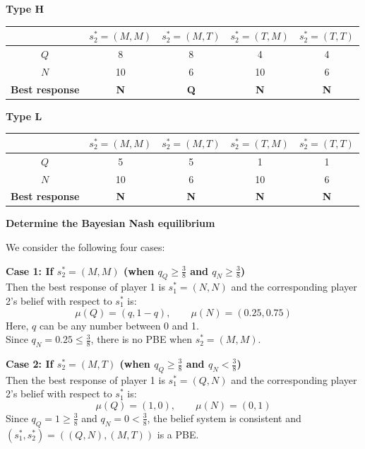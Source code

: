 \documentclass[twoside]{article}
\theoremstyle{definitionstyle}
\begin{document}
\begin{center}
\textbf{Type H} \\
\begin{tabular}{c|cccc}
    & $s_2^* = (M, M)$ & $s_2^* = (M, T)$ & $s_2^* = (T, M)$ & $s_2^* = (T, T)$ \\ \hline
    $Q$ & 8 & 8 & 4 & 4 \\
    $N$ & 10 & 6 & 10 & 6 \\ \hline
    \textbf{Best response} & \textbf{N} & \textbf{Q} & \textbf{N} & \textbf{N}
\end{tabular}
\end{center}

\begin{center}
\textbf{Type L} \\
\begin{tabular}{c|cccc}
    & $s_2^* = (M, M)$ & $s_2^* = (M, T)$ & $s_2^* = (T, M)$ & $s_2^* = (T, T)$ \\ \hline
    $Q$ & 5 & 5 & 1 & 1 \\
    $N$ & 10 & 6 & 10 & 6 \\ \hline
    \textbf{Best response} & \textbf{N} & \textbf{N} & \textbf{N} & \textbf{N}
\end{tabular}
\end{center}

\vspace{0.5em}
\noindent\textbf{Determine the Bayesian Nash equilibrium}

We consider the following four cases:

\vspace{0.5em}
\noindent\textbf{Case 1: If $s_2^* = (M, M)$ (when $q_Q \ge \frac{3}{8}$ and $q_N \ge \frac{3}{8}$)} \\
Then the best response of player 1 is $s_1^* = (N, N)$ and the corresponding player 2’s belief with respect to $s_1^*$ is:
$$\mu(Q) = (q, 1 - q), \qquad \mu(N) = (0.25, 0.75)$$
Here, $q$ can be any number between 0 and 1. \\
Since $q_N = 0.25 \le \frac{3}{8}$, there is no PBE when $s_2^* = (M, M)$.

\vspace{0.5em}
\noindent\textbf{Case 2: If $s_2^* = (M, T)$ (when $q_Q \ge \frac{3}{8}$ and $q_N < \frac{3}{8}$)} \\
Then the best response of player 1 is $s_1^* = (Q, N)$ and the corresponding player 2’s belief with respect to $s_1^*$ is:
$$\mu(Q) = (1,0), \qquad \mu(N) = (0, 1)$$
Since $q_Q = 1 \ge \frac{3}{8}$ and $q_N = 0 < \frac{3}{8}$, the belief system is consistent and $(s_1^*, s_2^*) = ((Q, N), (M, T))$ is a PBE.
\end{document}
